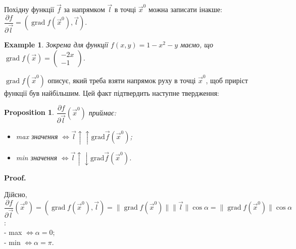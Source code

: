 \documentclass[a4paper, 10pt]{article}
\makeatletter
\DeclareMathOperator{\wordgrad}{grad}
\def\departial#1#2{\dfrac{\partial {#1}}{\partial {#2}}}
\theoremstyle{theoremdd}
\theoremstyle{theoremdd}
\theoremstyle{theoremdd}
\theoremstyle{theoremdd}
\theoremstyle{theoremdd}
\newtheorem{example}[theorem]{Example}
\theoremstyle{theoremdd}
\newtheorem{proposition}[theorem]{Proposition}
\theoremstyle{theoremdd}
\theoremstyle{theoremdd}
\theoremstyle{theoremdd}
\renewenvironment{proof}[1][Proof.\\]{\par
\pushQED{\hfill \qed}%
\normalfont \topsep6\p@\@plus6\p@\relax
\trivlist
\item\relax
{\bfseries
#1\@addpunct{.}}\hspace\labelsep\ignorespaces
}{%
\popQED\endtrivlist\@endpefalse
}
\newcommand\Norm[1]{\|#1\|}
\makeatother
\begin{document}
Похідну функції $\vec{f}$ за напрямком $\vec{l}$ в точці $\vec{x}^0$ можна записати інакше: $\departial{f}{\vec{l}} = \left( \wordgrad f(\vec{x}^0), \vec{l} \right)$.

\begin{example}
Зокрема для функції $f(x,y) = 1-x^2-y$ маємо, що $\wordgrad f(\vec{x}) = \begin{pmatrix}
-2x \\ -1
\end{pmatrix}$.
\end{example}

$\wordgrad f(\vec{x}^0)$ описує, який треба взяти напрямок руху в точці $\vec{x}^0$, щоб приріст функції був найбільшим. Цей факт підтвердить наступне твердження:

\begin{proposition}
$\dfrac{\partial f}{\partial \vec{l}}(\vec{x}^0)$ приймає:
\begin{itemize}[nosep,wide=0pt,label={-}]
\item max значення $ \iff \vec{l} \uparrow \uparrow \textrm{grad} \vec{f}(\vec{x}^0)$;
\item min значення $ \iff \vec{l} \uparrow \downarrow \textrm{grad} \vec{f}(\vec{x}^0)$.
\end{itemize}
\end{proposition}

\begin{proof}
Дійсно, $\departial{f}{\vec{l}}(\vec{x}^0) = \left( \wordgrad f(\vec{x}^0), \vec{l} \right) = \Norm{\wordgrad f(\vec{x}^0)} \Norm{\vec{l}} \cos \alpha = \Norm{\wordgrad f(\vec{x}^0)} \cos \alpha$:\\
- max $\iff \alpha = 0$;\\
- min $\iff \alpha = \pi$.
\end{proof}

\iffalse
\end{document}
